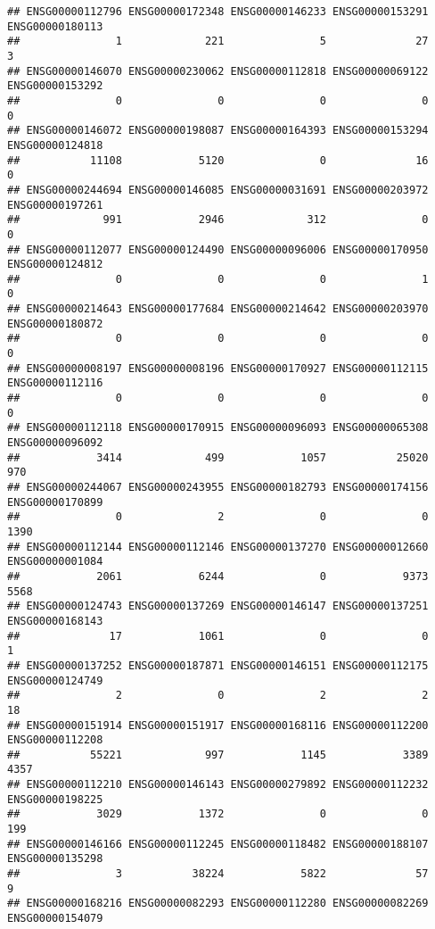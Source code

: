 \documentclass[
]{article}
\begin{document}
\begin{verbatim}
## ENSG00000112796 ENSG00000172348 ENSG00000146233 ENSG00000153291 ENSG00000180113 
##               1             221               5              27               3 
## ENSG00000146070 ENSG00000230062 ENSG00000112818 ENSG00000069122 ENSG00000153292 
##               0               0               0               0               0 
## ENSG00000146072 ENSG00000198087 ENSG00000164393 ENSG00000153294 ENSG00000124818 
##           11108            5120               0              16               0 
## ENSG00000244694 ENSG00000146085 ENSG00000031691 ENSG00000203972 ENSG00000197261 
##             991            2946             312               0               0 
## ENSG00000112077 ENSG00000124490 ENSG00000096006 ENSG00000170950 ENSG00000124812 
##               0               0               0               1               0 
## ENSG00000214643 ENSG00000177684 ENSG00000214642 ENSG00000203970 ENSG00000180872 
##               0               0               0               0               0 
## ENSG00000008197 ENSG00000008196 ENSG00000170927 ENSG00000112115 ENSG00000112116 
##               0               0               0               0               0 
## ENSG00000112118 ENSG00000170915 ENSG00000096093 ENSG00000065308 ENSG00000096092 
##            3414             499            1057           25020             970 
## ENSG00000244067 ENSG00000243955 ENSG00000182793 ENSG00000174156 ENSG00000170899 
##               0               2               0               0            1390 
## ENSG00000112144 ENSG00000112146 ENSG00000137270 ENSG00000012660 ENSG00000001084 
##            2061            6244               0            9373            5568 
## ENSG00000124743 ENSG00000137269 ENSG00000146147 ENSG00000137251 ENSG00000168143 
##              17            1061               0               0               1 
## ENSG00000137252 ENSG00000187871 ENSG00000146151 ENSG00000112175 ENSG00000124749 
##               2               0               2               2              18 
## ENSG00000151914 ENSG00000151917 ENSG00000168116 ENSG00000112200 ENSG00000112208 
##           55221             997            1145            3389            4357 
## ENSG00000112210 ENSG00000146143 ENSG00000279892 ENSG00000112232 ENSG00000198225 
##            3029            1372               0               0             199 
## ENSG00000146166 ENSG00000112245 ENSG00000118482 ENSG00000188107 ENSG00000135298 
##               3           38224            5822              57               9 
## ENSG00000168216 ENSG00000082293 ENSG00000112280 ENSG00000082269 ENSG00000154079 

\end{verbatim}
\end{document}
